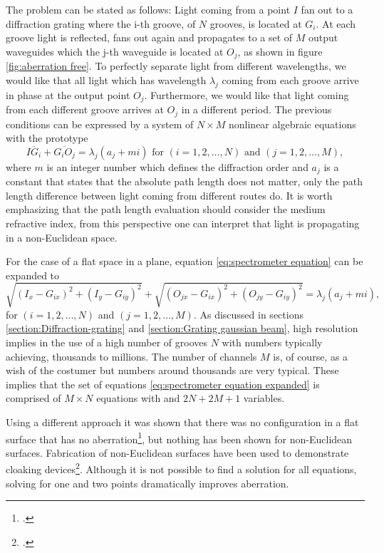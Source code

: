 \documentclass[12pt,twoside,english]{book}
\renewcommand{\~}{\perispomeni}%
\numberwithin{equation}{section}
\numberwithin{figure}{section}
\begin{document}
The problem can be stated as follows: Light coming from a point $I$ fan out to a diffraction grating where the i-th groove, of $N$ grooves, is located at $G_{i}$. At each groove light is reflected, fans out again and propagates to a set of $M$ output waveguides which the j-th waveguide is located at $O_{j}$, as shown in figure \ref{fig:aberration free}. To perfectly separate light from different wavelengths, we would like that all light which has wavelength $\lambda_{j}$ coming from each groove arrive in phase at the output point $O_{j}$. Furthermore, we would like that light coming from each different groove arrives at $O_{j}$ in a different period. The previous conditions can be expressed by a system of $N\times M$ nonlinear algebraic equations with the prototype
\begin{equation}
\overline{IG_{i}}+\overline{G_{i}O_{j}}=\lambda_{j}\left(a_{j}+mi\right)\text{ for }\left(i=1,2,\dots,N\right)\text{ and }\left(j=1,2,\dots,M\right),\label{eq:spectrometer equation}\end{equation}
where $m$ is an integer number which defines the diffraction order and $a_{j}$ is a constant that states that the absolute path length does not matter, only the path length difference between light coming from different routes do. It is worth emphasizing that the path length evaluation should consider the medium refractive index, from this perspective one can interpret that light is propagating in a non-Euclidean space.

For the case of a flat space in a plane, equation \ref{eq:spectrometer equation} can be expanded to
\begin{equation}
\sqrt{\left(I_{x}-G_{ix}\right)^{2}+\left(I_{y}-G_{iy}\right)^{2}}+\sqrt{\left(O_{jx}-G_{ix}\right)^{2}+\left(O_{jy}-G_{iy}\right)^{2}}=\lambda_{j}\left(a_{j}+mi\right),
\label{eq:spectrometer equation expanded}
\end{equation}
for $\left(i=1,2,\dots,N\right)$ and $\left(j=1,2,\dots,M\right)$. As discussed in sections \ref{section:Diffraction-grating} and \ref{section:Grating gaussian beam}, high resolution implies in the use of a high number of grooves $N$ with numbers typically achieving, thousands to millions. The number of channels $M$ is, of course, as a wish of the costumer but numbers around thousands are very typical. These implies that the set of equations \ref{eq:spectrometer equation expanded} is comprised of $M\times N$ equations with and $2N+2M+1$ variables.

Using a different approach it was shown that there was no configuration in a flat surface that has no aberration\footcite{Marz:1992p28,Beutler:1945p8,Namioka:1959p48,Velzel:1976p67}, but nothing has been shown for non-Euclidean surfaces. Fabrication of non-Euclidean surfaces have been used to demonstrate cloaking devices\footcite{Gabrielli:2009p2590}. Although it is not possible to find a solution for all equations, solving for one and two points dramatically improves aberration. 
\end{document}
